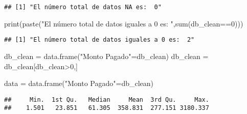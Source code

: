 \documentclass[
]{article}
\newenvironment{Shaded}{\begin{snugshade}}{\end{snugshade}}
\newcommand{\DecValTok}[1]{\textcolor[rgb]{0.00,0.00,0.81}{#1}}
\newcommand{\FunctionTok}[1]{\textcolor[rgb]{0.00,0.00,0.00}{#1}}
\newcommand{\NormalTok}[1]{#1}
\newcommand{\OtherTok}[1]{\textcolor[rgb]{0.56,0.35,0.01}{#1}}
\newcommand{\SpecialCharTok}[1]{\textcolor[rgb]{0.00,0.00,0.00}{#1}}
\newcommand{\StringTok}[1]{\textcolor[rgb]{0.31,0.60,0.02}{#1}}
\begin{document}
\begin{Shaded}
\end{Shaded}

\begin{verbatim}
## [1] "El número total de datos NA es:  0"
\end{verbatim}

\begin{Shaded}
\begin{Highlighting}[]
\FunctionTok{print}\NormalTok{(}\FunctionTok{paste}\NormalTok{(}\StringTok{"El número total de datos iguales a 0 es: "}\NormalTok{,}\FunctionTok{sum}\NormalTok{(db\_clean}\SpecialCharTok{==}\DecValTok{0}\NormalTok{)))}
\end{Highlighting}
\end{Shaded}

\begin{verbatim}
## [1] "El número total de datos iguales a 0 es:  2"
\end{verbatim}

\begin{Shaded}
\begin{Highlighting}[]
\NormalTok{db\_clean }\OtherTok{=} \FunctionTok{data.frame}\NormalTok{(}\StringTok{"Monto Pagado"}\OtherTok{=}\NormalTok{db\_clean)}
\NormalTok{db\_clean }\OtherTok{=}\NormalTok{ db\_clean[db\_clean}\SpecialCharTok{\textgreater{}}\DecValTok{0}\NormalTok{,]}

\NormalTok{data }\OtherTok{=} \FunctionTok{data.frame}\NormalTok{(}\StringTok{"Monto Pagado"}\OtherTok{=}\NormalTok{db\_clean)}
\end{Highlighting}
\end{Shaded}

\begin{Shaded}
\end{Shaded}

\begin{verbatim}
##     Min.  1st Qu.   Median     Mean  3rd Qu.     Max. 
##    1.501   23.851   61.305  358.831  277.151 3180.337
\end{verbatim}
\end{document}
